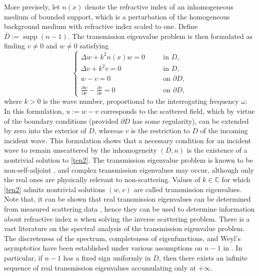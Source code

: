 \documentclass[10pt,a4paper]{amsart}
\begin{document}
\noindent
More precisely, let $n(x)$ denote the refractive index of an inhomogeneous medium of bounded support, which is a perturbation of the homogeneous background medium with refractive index scaled to one. Define $\overline{D} := \operatorname{supp}(n-1)$. The transmission eigenvalue problem is then formulated as finding $v \neq 0$ and $w \neq 0$ satisfying
\begin{equation}\label{ten2}
\left\{
\begin{array}{rrcl}
\Delta w + k^2 n(x) w = 0 & \quad & \text{in } D, \\
\Delta v + k^2 v = 0 & \quad & \text{in } D,\\
w-v = 0 & \quad & \text{on } \partial D,\\
\displaystyle \frac{\partial w}{\partial \nu} - \frac{\partial v}{\partial \nu} = 0 & \quad & \text{on } \partial D,
\end{array}
\right.
\end{equation}
where $k > 0$ is the wave number, proportional to the interrogating frequency $\omega$. In this formulation, $u := w-v$ corresponds to the scattered field, which by virtue of the boundary conditions (provided $\partial D$ has some regularity), can be extended by zero into the exterior of $D$, whereas $v$ is the restriction to $D$ of the incoming incident wave. This formulation shows that a necessary condition for an incident wave to remain unscattered by the inhomogeneity $(D,n)$ is the existence of a nontrivial solution to \eqref{ten2}. The transmission eigenvalue problem is known to be non-self-adjoint \cite{CCH-book}, and complex transmission eigenvalues may occur, although only the real ones are physically relevant to non-scattering. Values of $k \in \mathbb{C}$ for which \eqref{ten2} admits nontrivial solutions $(w,v)$ are called transmission eigenvalues. Note that, it can be shown that real transmission eigenvalues can be determined from measured scattering data \cite{CCH-book, eigm1,eigm2}, hence they can be used to determine information about refractive index $n$ when solving the  inverse scattering problem. There is a vast literature on the spectral analysis of the transmission eigenvalue problem. The discreteness of the spectrum, completeness of eigenfunctions, and Weyl’s asymptotics have been established under various assumptions on $n-1$ in \cite{nguyenn, Ki, rob, vodev, vodev2}. In particular, if $n-1$ has a fixed sign uniformly in $D$, then there exists an infinite sequence of real transmission eigenvalues accumulating only at $+\infty$. 
\end{document}
